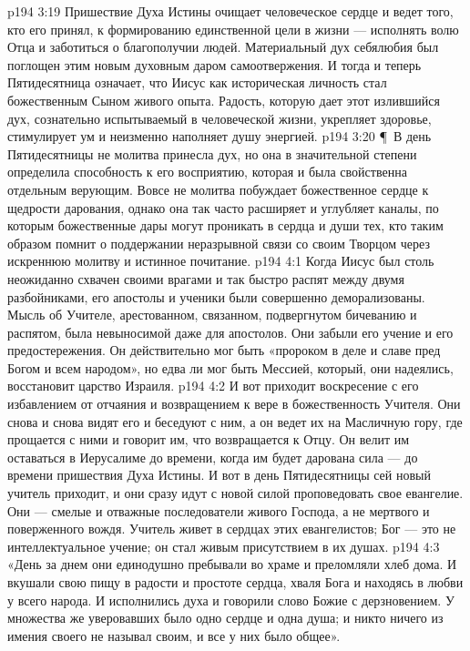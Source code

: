 \vs p194 3:19 Пришествие Духа Истины очищает человеческое сердце и ведет того, кто его принял, к формированию единственной цели в жизни --- исполнять волю Отца и заботиться о благополучии людей. Материальный дух себялюбия был поглощен этим новым духовным даром самоотвержения. И тогда и теперь Пятидесятница означает, что Иисус как историческая личность стал божественным Сыном живого опыта. Радость, которую дает этот излившийся дух, сознательно испытываемый в человеческой жизни, укрепляет здоровье, стимулирует ум и неизменно наполняет душу энергией.
\vs p194 3:20 \P\ В день Пятидесятницы не молитва принесла дух, но она в значительной степени определила способность к его восприятию, которая и была свойственна отдельным верующим. Вовсе не молитва побуждает божественное сердце к щедрости дарования, однако она так часто расширяет и углубляет каналы, по которым божественные дары могут проникать в сердца и души тех, кто таким образом помнит о поддержании неразрывной связи со своим Творцом через искреннюю молитву и истинное почитание.
\vs p194 4:1 Когда Иисус был столь неожиданно схвачен своими врагами и так быстро распят между двумя разбойниками, его апостолы и ученики были совершенно деморализованы. Мысль об Учителе, арестованном, связанном, подвергнутом бичеванию и распятом, была невыносимой даже для апостолов. Они забыли его учение и его предостережения. Он действительно мог быть «пророком в деле и славе пред Богом и всем народом», но едва ли мог быть Мессией, который, они надеялись, восстановит царство Израиля.
\vs p194 4:2 И вот приходит воскресение с его избавлением от отчаяния и возвращением к вере в божественность Учителя. Они снова и снова видят его и беседуют с ним, а он ведет их на Масличную гору, где прощается с ними и говорит им, что возвращается к Отцу. Он велит им оставаться в Иерусалиме до времени, когда им будет дарована сила --- до времени пришествия Духа Истины. И вот в день Пятидесятницы сей новый учитель приходит, и они сразу идут с новой силой проповедовать свое евангелие. Они --- смелые и отважные последователи живого Господа, а не мертвого и поверженного вождя. Учитель живет в сердцах этих евангелистов; Бог --- это не интеллектуальное учение; он стал живым присутствием в их душах.
\vs p194 4:3 «День за днем они единодушно пребывали во храме и преломляли хлеб дома. И вкушали свою пищу в радости и простоте сердца, хваля Бога и находясь в любви у всего народа. И исполнились духа и говорили слово Божие с дерзновением. У множества же уверовавших было одно сердце и одна душа; и никто ничего из имения своего не называл своим, и все у них было общее».
